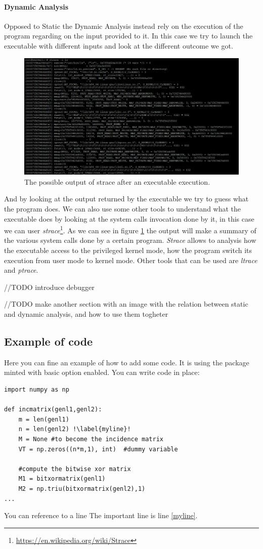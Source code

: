 \documentclass{article}
\begin{document}
\paragraph{Dynamic Analysis}
Opposed to Static the Dynamic Analysis instead rely on the execution of the program regarding on the input provided to it. In this case we try to launch the executable with different inputs and look at the different outcome we got.
\begin{figure}[htp]
    \centering
    \includegraphics[width=1\textwidth]{images/strace.png}
    \caption{The possible output of strace after an executable execution.}
    \label{fig:strace}
\end{figure}
And by looking at the output returned by the executable we try to guess what the program does. We can also use some other tools to understand what the executable does by looking at the system calls invocation done by it, in this case we can user \textit{strace}\footnote{\url{https://en.wikipedia.org/wiki/Strace}}. As we can see in figure \ref{fig:strace} the output will make a summary of the various system calls done by a certain program.
\textit{Strace} allows to analysis how the executable access to the privileged kernel mode, how the program switch its execution from user mode to kernel mode. Other tools that can be used are \textit{ltrace} and \textit{ptrace}.

//TODO introduce debugger

//TODO make another section with an image with the relation between static and dynamic analysis, and how to use them togheter

\subsection{Example of code}
Here you can fine an example of how to add some code. It is using the package minted with basic option enabled.
You can write code in place:
\begin{verbatim}
import numpy as np
    
def incmatrix(genl1,genl2):
    m = len(genl1)
    n = len(genl2) !\label{myline}!
    M = None #to become the incidence matrix
    VT = np.zeros((n*m,1), int)  #dummy variable
    
    #compute the bitwise xor matrix
    M1 = bitxormatrix(genl1)
    M2 = np.triu(bitxormatrix(genl2),1) 
...
\end{verbatim}
You can reference to a line
The important line is line \ref{myline}.
\end{document}
